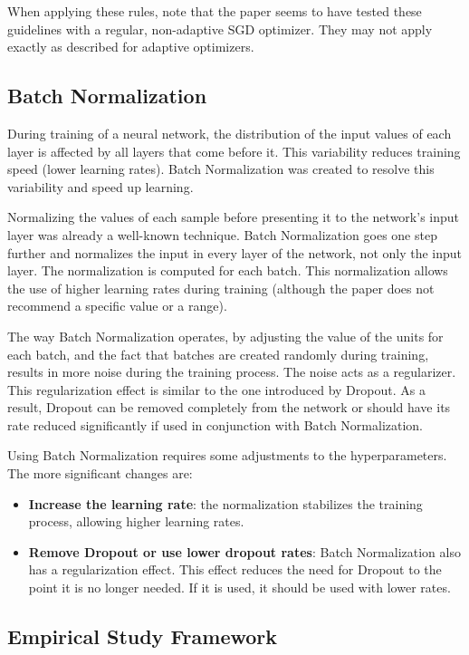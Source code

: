 \documentclass[../dropout-vs-batch-normalization.tex]{subfiles}
\begin{document}
When applying these rules, note that the paper seems to have tested these guidelines with a regular, non-adaptive SGD optimizer. They may not apply exactly as described for adaptive optimizers.

\subsection{Batch Normalization}

During training of a neural network, the distribution of the input values of each layer is affected by all layers that come before it. This variability reduces training speed (lower learning rates). Batch Normalization \cite{Ioffe2015} was created to resolve this variability and speed up learning.

Normalizing the values of each sample before presenting it to the network's input layer was already a well-known technique. Batch Normalization goes one step further and normalizes the input in every layer of the network, not only the input layer. The normalization is computed for each batch. This normalization allows the use of higher learning rates during training (although the paper does not recommend a specific value or a range).

The way Batch Normalization operates, by adjusting the value of the units for each batch, and the fact that batches are created randomly during training, results in more noise during the training process. The noise acts as a regularizer. This regularization effect is similar to the one introduced by Dropout. As a result, Dropout can be removed completely from the network or should have its rate reduced significantly if used in conjunction with Batch Normalization.

Using Batch Normalization requires some adjustments to the hyperparameters. The more significant changes are:

\begin{itemize}
\item \textbf{Increase the learning rate}: the normalization stabilizes the training process, allowing higher learning rates.
\item \textbf{Remove Dropout or use lower dropout rates}: Batch Normalization also has a regularization effect. This effect reduces the need for Dropout to the point it is no longer needed. If it is used, it should be used with lower rates. 
\end{itemize}


\subsection{Empirical Study Framework}
\end{document}
